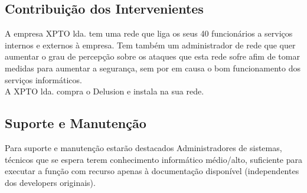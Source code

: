 \subsection{Contribuição dos Intervenientes}
A empresa XPTO lda. tem uma rede que liga os seus 40 funcionários a serviços internos e externos à empresa. Tem também um administrador de rede que
quer aumentar o grau de percepção sobre os ataques que esta rede sofre afim de tomar medidas para aumentar a segurança, sem por em
causa o bom funcionamento dos serviços informáticos.\\
A XPTO lda. compra o Delusion e instala na sua rede.

\subsection{Suporte e Manutenção}
Para suporte e manutenção estarão destacados Administradores de sistemas, técnicos que se espera terem conhecimento informático médio/alto,
suficiente para executar a função com recurso apenas à documentação disponível (independentes dos developers originais).

